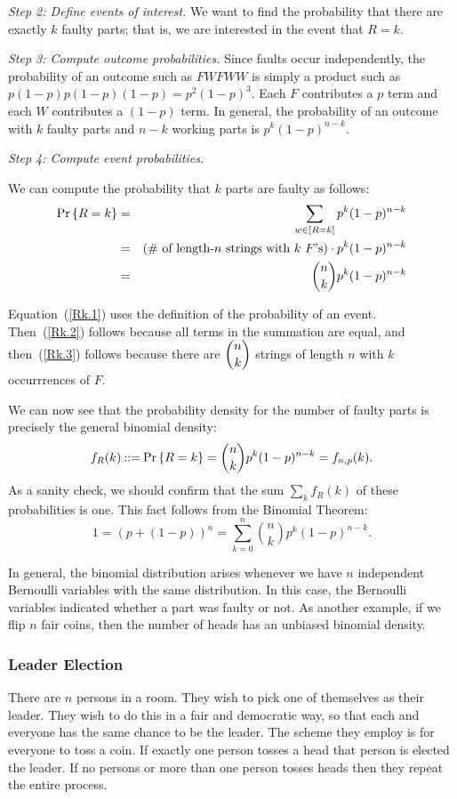 \documentclass[11pt,twoside]{article}
\begin{document}
\emph{Step 2: Define events of interest. } We want to find the
probability that there are exactly $k$ faulty parts; that is, we are
interested in the event that $R = k$.

\emph{Step 3: Compute outcome probabilities. } Since faults occur
independently, the probability of an outcome such as $FWFWW$ is simply
a product such as $p(1-p)p(1-p)(1-p) = p^2(1-p)^3$.  Each $F$
contributes a $p$ term and each $W$ contributes a $(1-p)$ term.  In
general, the probability of an outcome with $k$ faulty parts and $n-k$
working parts is $p^k (1-p)^{n-k}$.

\emph{Step 4: Compute event probabilities. }

We can compute the probability that $k$ parts are faulty as follows:
\begin{eqnarray}
\mathop{\textup{Pr}}\nolimits\left\{R = k\right\} & = & \sum_{w \in [R=k]}
              p^k (1-p)^{n-k} \label{Rk.1}\\
& = & \mbox{(\# of length-$n$ strings with $k$ $F$'s)} \cdot p^k (1-p)^{n-k} \label{Rk.2}\\
& = & \binom{n}{k} p^k (1-p)^{n-k}\label{Rk.3}
\end{eqnarray}

Equation~(\ref{Rk.1}) uses the definition of the probability of an event.
Then~(\ref{Rk.2}) follows because all terms in the summation are equal,
and then~(\ref{Rk.3}) follows because there are $\dbinom{n}{k}$ strings of
length $n$ with $k$ occurrrences of $F$.

We can now see that the probability density for the number of faulty parts
is precisely the general binomial density:
\[
f_R(k) \mathbin{::=} \mathop{\textup{Pr}}\nolimits\left\{R = k\right\} = \binom{n}{k} p^k (1-p)^{n-k} = f_{n, p}(k).
\]
As a sanity check, we should confirm that the sum $\sum_k f_R(k)$ of
these probabilities is one.  This fact follows from the Binomial Theorem:
\[
1 = (p + (1 - p))^n = \sum_{k=0}^n \binom{n}{k}p^k(1-p)^{n-k}.
\]

In general, the binomial distribution arises whenever we have $n$
independent Bernoulli variables with the same distribution.  In this case,
the Bernoulli variables indicated whether a part was faulty or not.  As
another example, if we flip $n$ fair coins, then the number of heads has
an unbiased binomial density.

\subsubsection{Leader Election}

There are $n$ persons in a room. They wish to pick one of themselves as
their leader. They wish to do this in a fair and democratic way, so that
each and everyone has the same chance to be the leader. The scheme they
employ is for everyone to toss a coin. If exactly one person tosses a head
that person is elected the leader. If no persons or more than one person
tosses heads then they repeat the entire process.  
\end{document}
